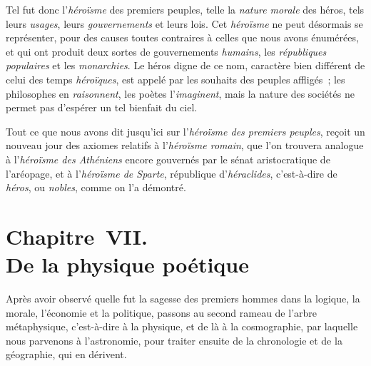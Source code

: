 \documentclass[french,twoside]{book} %
\newcommand\chapteropen{} %
\newcommand\chaptercont{} %
\newcommand\chapterclose{} %
\begin{document}
Tel fut donc l’{\itshape héroïsme} des premiers peuples, telle la {\itshape nature morale} des héros, tels leurs {\itshape usages}, leurs {\itshape gouvernements} et leurs lois. Cet {\itshape héroïsme} ne  peut désormais se représenter, pour des causes toutes contraires à celles que nous avons énumérées, et qui ont produit deux sortes de gouvernements {\itshape humains}, les {\itshape républiques populaires} et les {\itshape monarchies}. Le héros digne de ce nom, caractère bien différent de celui des temps {\itshape héroïques}, est appelé par les souhaits des peuples affligés ; les philosophes en {\itshape raisonnent}, les poètes l’{\itshape imaginent}, mais la nature des sociétés ne permet pas d’espérer un tel bienfait du ciel.\par
Tout ce que nous avons dit jusqu’ici sur l’{\itshape héroïsme des premiers peuples}, reçoit un nouveau jour des axiomes relatifs à l’{\itshape héroïsme romain}, que l’on trouvera analogue à l’{\itshape héroïsme des Athéniens} encore gouvernés par le sénat aristocratique de l’aréopage, et à l’{\itshape héroïsme de Sparte}, république d’{\itshape héraclides}, c’est-à-dire de {\itshape héros}, ou {\itshape nobles}, comme on l’a démontré.
\chapterclose


\chapteropen
\chapter[{Chapitre VII. De la physique poétique}]{Chapitre VII. \\
De la physique poétique}

\chaptercont
\noindent  Après avoir observé quelle fut la sagesse des premiers hommes dans la logique, la morale, l’économie et la politique, passons au second rameau de l’arbre métaphysique, c’est-à-dire à la physique, et de là à la cosmographie, par laquelle nous parvenons à l’astronomie, pour traiter ensuite de la chronologie et de la géographie, qui en dérivent.\par
\end{document}
